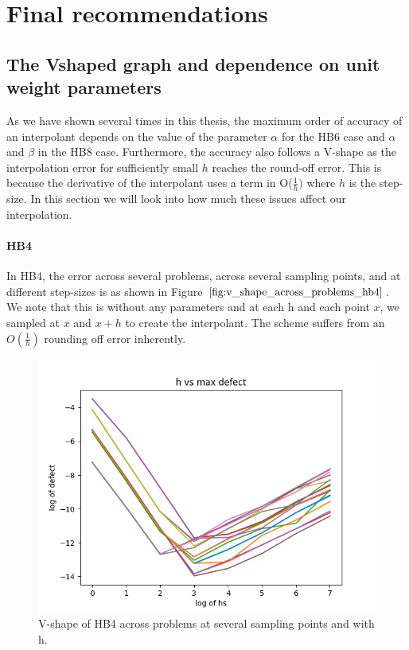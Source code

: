 





\section{Final recommendations}
\label{section:final_recommendations_defect_control}
\subsection{The Vshaped graph and dependence on unit weight parameters}
\label{section:v_shaped_graph}
As we have shown several times in this thesis, the maximum order of accuracy of an interpolant depends on the value of the parameter $\alpha$ for the HB6 case and $\alpha$ and $\beta$ in the HB8 case. Furthermore, the accuracy also follows a V-shape as the interpolation error for sufficiently small $h$ reaches the round-off error. This is because the derivative of the interpolant uses a term in O($\frac{1}{h})$ where $h$ is the step-size. In this section we will look into how much these issues affect our interpolation. 

\paragraph{HB4}
In HB4, the error across several problems, across several sampling points, and at different step-sizes is as shown in Figure $\ref{fig:v_shape_across_problems_hb4}$. We note that this is without any parameters and at each h and each point $x$, we sampled at $x$ and $x + h$ to create the interpolant. The scheme suffers from an $O(\frac{1}{h})$ rounding off error inherently.
\begin{figure}[H]
\centering
\includegraphics[width=0.7\linewidth]{./figures/v_shape_across_problems_hb4}
\caption{V-shape of HB4 across problems at several sampling points and with h.}
\label{fig:v_shape_across_problems_hb4}
\end{figure}

